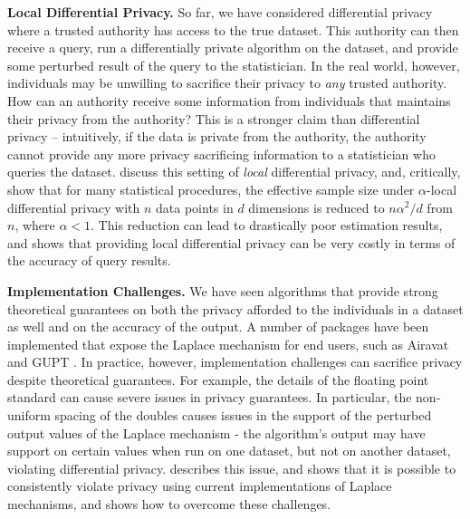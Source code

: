 \documentclass{article} %
\begin{document}
\textbf{Local Differential Privacy.} So far, we have considered differential
privacy where a trusted authority has access to the true dataset. This authority
can then receive a query, run a differentially private algorithm on the dataset,
and provide some perturbed result of the query to the statistician. In the real
world, however, individuals may be unwilling to sacrifice their privacy to
\textit{any} trusted authority. How can an authority receive some information
from individuals that maintains their privacy from the authority? This is a
stronger claim than differential privacy -- intuitively, if the data is private
from the authority, the authority cannot provide any more privacy sacrificing
information to a statistician who queries the dataset. \cite{duchi2013local}
discuss this setting of \textit{local} differential privacy, and, critically,
show that for many statistical procedures, the effective sample size under
$\alpha$-local differential privacy with $n$ data points in $d$ dimensions is
reduced to $n \alpha^2 / d$ from $n$, where $\alpha < 1$. This reduction can lead to drastically poor
estimation results, and shows that providing local differential privacy can be
very costly in terms of the accuracy of query results.

\textbf{Implementation Challenges.} We have seen algorithms that provide
strong theoretical guarantees on both the privacy afforded to the individuals in
a dataset as well and on the accuracy of the output. A number of packages have
been implemented that expose the Laplace mechanism for end users, such as
Airavat \cite{mohan2012gupt} and GUPT \cite{roy2010airavat}. In practice,
however, implementation challenges can sacrifice privacy despite theoretical
guarantees. For example, the details of the floating point standard can cause
severe issues in privacy guarantees. In particular, the non-uniform spacing of
the doubles causes issues in the support of the perturbed output values of the
Laplace mechanism - the algorithm's output may have support on certain values
when run on one dataset, but not on another dataset, violating differential
privacy.  \cite{mironov2012significance} describes this issue, and shows that it
is possible to consistently violate privacy using current implementations of
Laplace mechanisms, and shows how to overcome these challenges.
\end{document}
